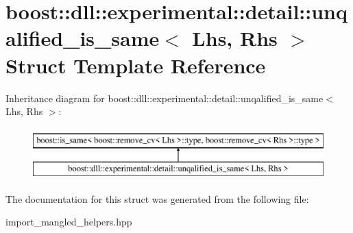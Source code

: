 \hypertarget{a01444}{}\section{boost\+:\+:dll\+:\+:experimental\+:\+:detail\+:\+:unqalified\+\_\+is\+\_\+same$<$ Lhs, Rhs $>$ Struct Template Reference}
\label{a01444}
Inheritance diagram for boost\+:\+:dll\+:\+:experimental\+:\+:detail\+:\+:unqalified\+\_\+is\+\_\+same$<$ Lhs, Rhs $>$\+:\begin{figure}[H]
\begin{center}
\leavevmode
\includegraphics[height=2.000000cm]{a01444}
\end{center}
\end{figure}


The documentation for this struct was generated from the following file\+:\begin{DoxyCompactItemize}
\item 
import\+\_\+mangled\+\_\+helpers.\+hpp\end{DoxyCompactItemize}

